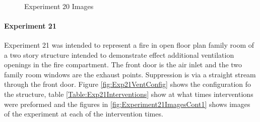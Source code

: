 \documentclass{article}
\begin{document}
\begin{figure}[H]
	\ContinuedFloat 
	\centering 
	 \ 
	\caption{Experiment 20 Images}
	\label{fig:Experiment20ImagesCont3} 
\end{figure}

\paragraph{Experiment 21}\mbox{}

Experiment 21 was intended to represent a fire in open floor plan family room of a two story structure intended to demonstrate effect additional ventilation openings in the fire compartment. The front door is the air inlet and the two family room windows are the exhaust points. Suppression is via a straight stream through the front door. Figure \ref{fig:Exp21VentConfig} shows the configuration fo the structure, table \ref{Table:Exp21Interventions} show at what times interventions were preformed and the figures in \ref{fig:Experiment21ImagesCont1} shows images of the experiment at each of the intervention times.
\end{document}
